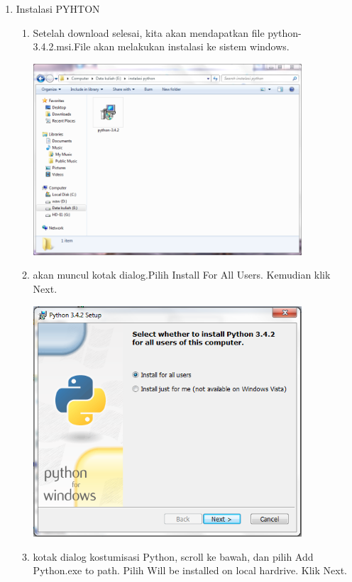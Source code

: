 \begin{enumerate}
\item   Instalasi PYHTON
    \begin{enumerate}
   \item \noindent
   Setelah download selesai, kita akan mendapatkan file python-3.4.2.msi.File  akan melakukan instalasi ke sistem windows.
    \begin{center}
            \includegraphics[width=10cm]{figures/1.png}
        \end{center}
    \item
    akan muncul kotak dialog.Pilih Install For All Users. Kemudian klik Next.
   \begin{center}
            \includegraphics[width=10cm]{figures/2.PNG}
        \end{center}
    \item kotak dialog kostumisasi Python, scroll ke bawah, dan pilih Add Python.exe to path. Pilih Will be installed on local hardrive. Klik Next.
   \begin{center}

\end{center}
\end{enumerate}
\end{enumerate}
